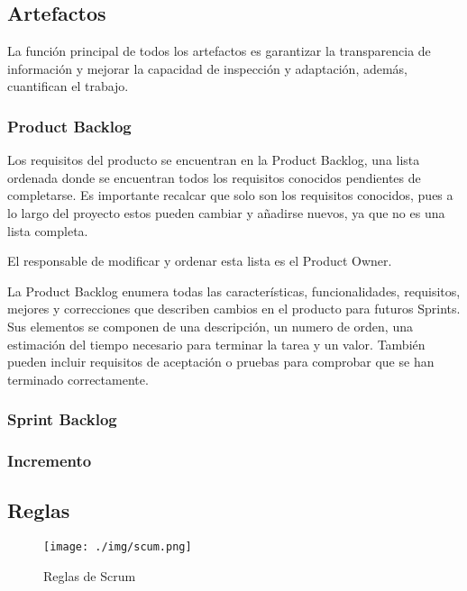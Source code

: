 \subsection{Artefactos}

La función principal de todos los artefactos es garantizar la transparencia de información y mejorar 
la capacidad de inspección y adaptación, además, cuantifican el trabajo.

\subsubsection{Product Backlog}

Los requisitos del producto se encuentran en la Product Backlog, una lista ordenada donde se encuentran 
todos los requisitos conocidos pendientes de completarse. Es importante recalcar que solo son los 
requisitos conocidos, pues a lo largo del proyecto estos pueden cambiar y añadirse nuevos, ya que no es 
una lista completa.

El responsable de modificar y ordenar esta lista es el Product Owner.

La Product Backlog enumera todas las características, funcionalidades, requisitos, mejores y correcciones 
que describen cambios en el producto para futuros Sprints. Sus elementos se componen de una descripción, 
un numero de orden, una estimación del tiempo necesario para terminar la tarea y un valor. También pueden 
incluir requisitos de aceptación o pruebas para comprobar que se han terminado correctamente.

\subsubsection{Sprint Backlog}

\subsubsection{Incremento}


\subsection{Reglas}

\begin{figure}[!h]
	\begin{center}
		\texttt{[image: ./img/scum.png]}
		\caption{Reglas de Scrum}
		\label{fig:scrum}
	\end{center}
\end{figure}

